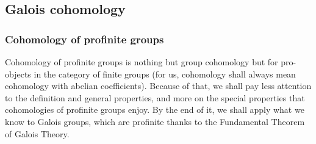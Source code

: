     \subsection{Galois cohomology}
        \subsubsection{Cohomology of profinite groups}
            Cohomology of profinite groups is nothing but group cohomology but for pro-objects in the category of finite groups (for us, cohomology shall always mean cohomology with abelian coefficients). Because of that, we shall pay less attention to the definition and general properties, and more on the special properties that cohomologies of profinite groups enjoy. By the end of it, we shall apply what we know to Galois groups, which are profinite thanks to the Fundamental Theorem of Galois Theory. 
            
